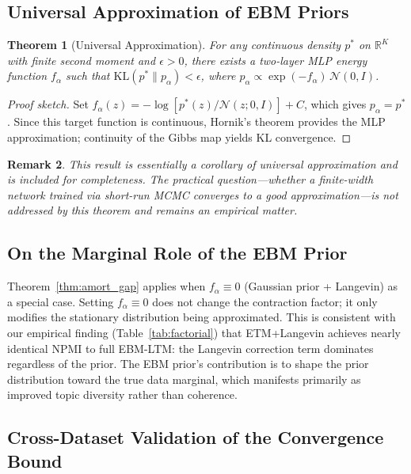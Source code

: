 \documentclass[10pt]{article}
\newtheorem{theorem}{Theorem}[section]
\newtheorem{remark_thm}[theorem]{Remark}
\newcommand{\R}{\mathbb{R}}
\newcommand{\KL}{\mathrm{KL}}
\begin{document}
\subsection{Universal Approximation of EBM Priors}

\begin{theorem}[Universal Approximation]
\label{thm:universal}
For any continuous density $p^*$ on $\R^K$ with finite second moment and $\epsilon > 0$,
there exists a two-layer MLP energy function $f_\alpha$ such that
$\KL(p^* \| p_\alpha) < \epsilon$,
where $p_\alpha \propto \exp(-f_\alpha)\,\mathcal{N}(0,I)$.
\end{theorem}

\begin{proof}[Proof sketch]
Set $f_\alpha(z) = -\log[p^*(z)/\mathcal{N}(z;0,I)] + C$, which gives $p_\alpha = p^*$.
Since this target function is continuous, Hornik's theorem \citep{hornik1991} provides
the MLP approximation; continuity of the Gibbs map yields KL convergence.
\end{proof}

\begin{remark_thm}
This result is essentially a corollary of universal approximation and is included for
completeness. The \emph{practical} question---whether a finite-width network trained
via short-run MCMC converges to a good approximation---is not addressed by this theorem
and remains an empirical matter.
\end{remark_thm}

\subsection{On the Marginal Role of the EBM Prior}

Theorem~\ref{thm:amort_gap} applies when $f_\alpha \equiv 0$ (Gaussian prior + Langevin)
as a special case. Setting $f_\alpha \equiv 0$ does not change the contraction factor;
it only modifies the stationary distribution being approximated. This is consistent
with our empirical finding (Table~\ref{tab:factorial}) that ETM+Langevin achieves
nearly identical NPMI to full EBM-LTM: the Langevin correction term dominates regardless
of the prior. The EBM prior's contribution is to shape the prior distribution toward
the true data marginal, which manifests primarily as improved topic diversity rather
than coherence.

\subsection{Cross-Dataset Validation of the Convergence Bound}
\label{sec:cross_dataset_theory}
\end{document}

